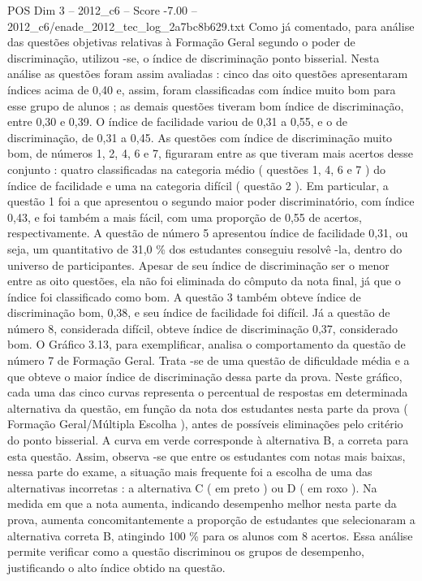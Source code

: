 \begin{textsample}{POS Dim 3 – 2012\_c6 – Score -7.00 – 2012\_c6/enade\_2012\_tec\_log\_2a7bc8b629.txt}
Como já comentado, para análise das questões objetivas relativas à Formação Geral segundo o poder de discriminação, utilizou -se, o índice de discriminação ponto bisserial.
Nesta análise as questões foram assim avaliadas : cinco das oito questões apresentaram índices acima de 0,40 e, assim, foram classificadas com índice muito bom para esse grupo de alunos ; as demais questões tiveram bom índice de discriminação, entre 0,30 e 0,39.
O índice de facilidade variou de 0,31 a 0,55, e o de discriminação, de 0,31 a 0,45.
As questões com índice de discriminação muito bom, de números 1, 2, 4, 6 e 7, figuraram entre as que tiveram mais acertos desse conjunto : quatro classificadas na categoria médio ( questões 1, 4, 6 e 7 ) do índice de facilidade e uma na categoria difícil ( questão 2 ).
Em particular, a questão 1 foi a que apresentou o segundo maior poder discriminatório, com índice 0,43, e foi também a mais fácil, com uma proporção de 0,55 de acertos, respectivamente.
A questão de número 5 apresentou índice de facilidade 0,31, ou seja, um quantitativo de 31,0 \% dos estudantes conseguiu resolvê -la, dentro do universo de participantes.
Apesar de seu índice de discriminação ser o menor entre as oito questões, ela não foi eliminada do cômputo da nota final, já que o índice foi classificado como bom.
A questão 3 também obteve índice de discriminação bom, 0,38, e seu índice de facilidade foi difícil.
Já a questão de número 8, considerada difícil, obteve índice de discriminação 0,37, considerado bom.
O Gráfico 3.13, para exemplificar, analisa o comportamento da questão de número 7 de Formação Geral.
Trata -se de uma questão de dificuldade média e a que obteve o maior índice de discriminação dessa parte da prova.
Neste gráfico, cada uma das cinco curvas representa o percentual de respostas em determinada alternativa da questão, em função da nota dos estudantes nesta parte da prova ( Formação Geral/Múltipla Escolha ), antes de possíveis eliminações pelo critério do ponto bisserial.
A curva em verde corresponde à alternativa B, a correta para esta questão.
Assim, observa -se que entre os estudantes com notas mais baixas, nessa parte do exame, a situação mais frequente foi a escolha de uma das alternativas incorretas : a alternativa C ( em preto ) ou D ( em roxo ).
Na medida em que a nota aumenta, indicando desempenho melhor nesta parte da prova, aumenta concomitantemente a proporção de estudantes que selecionaram a alternativa correta B, atingindo 100 \% para os alunos com 8 acertos.
Essa análise permite verificar como a questão discriminou os grupos de desempenho, justificando o alto índice obtido na questão.

\end{textsample}
